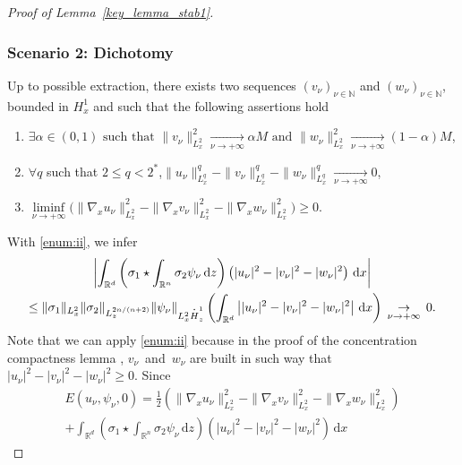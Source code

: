 \documentclass[11pt]{article}
\newenvironment{enumeratei}
{\bgroup\def\theenumi{\roman{enumi}}\def\theenumii{\arabic{enumii}}\begin{enumerate}}
{\end{enumerate}\egroup}
\DeclareRobustCommand{\accentset}[2]{\overset{#1}{#2}}
\theoremstyle{definition}
\newcommand*{\overbigdot}[1]{%
\accentset{\mbox{\large\bfseries .}}{#1}}
\newenvironment{ProofOf}[1]{\begin{proof}[Proof of #1]}{\end{proof}}
\newcommand{\R}{\mathbb{R}}
\let\ds\displaystyle
\newcommand{\ud}{\, {\mathrm{d}}}
\begin{document}
\begin{ProofOf}{Lemma~\ref{key_lemma_stab1}}
\subsubsection*{Scenario 2: Dichotomy} Up to possible extraction, there exists two sequences $(v_{\nu})_{\nu\in\mathbb N}$ and $(w_{\nu})_{\nu\in\mathbb N}$, bounded in $H_{x}^{1}$
and such that the following assertions hold
\begin{enumeratei}
\item\label{enum:i}
$\ds \exists\alpha\in(0,1)\text{ such that }\|v_{\nu}\|_{L_{x}^{2}}^{2}\underset{\nu\to+\infty}{\to}\alpha M\text{ and }\|w_{\nu}\|_{L_{x}^{2}}^{2}\underset{\nu\to+\infty}{\to}(1-\alpha)M$,
\item
\label{enum:ii}
$\forall q$ such that $2\leq q<2^{*}$,\quad$\ds\|u_{\nu}\|_{L_{x}^{q}}^{q}-\|v_{\nu}\|_{L_{x}^{q}}^{q}-\|w_{\nu}\|_{L_{x}^{q}}^{q}\underset{\nu\to+\infty}{\to}0$,
\item
\label{enum:iii}
$\ds\underset{\nu\to+\infty}{\liminf}\bigl(\|\nabla_{x}u_{\nu}\|_{L_{x}^{2}}^{2}-\|\nabla_{x}v_{\nu}\|_{L_{x}^{2}}^{2}-\|\nabla_{x}w_{\nu}\|_{L_{x}^{2}}^{2}\bigr)\geq0$.
\end{enumeratei}
\noindent
With \eqref{enum:ii}, we infer
\begin{multline}\label{application_ii}
\left|\int_{\R^{d}}\left(\sigma_{1}\star\int_{\R^{n}}\sigma_{2}\psi_{\nu}\ud z\right)\left(|u_{\nu}|^{2}-|v_{\nu}|^{2}-|w_{\nu}|^{2}\right)\ud x\right|\\
\leq\|\sigma_{1}\|_{L_{x}^{2}}\|\sigma_{2}\|_{L_{z}^{2n/(n+2)}}\|\psi_{\nu}\|_{L_{x}^{2}\overbigdot{H}_{z}^{1}}\left(\int_{\R^{d}}\left||u_{\nu}|^{2}-|v_{\nu}|^{2}-|w_{\nu}|^{2}\right|\ud x\right)\,\underset{\nu\to +\infty}{\to}\,0.
\end{multline}
Note that we can apply \eqref{enum:ii} because in the proof of the concentration compactness lemma
\cite[Prop.\,1.7.6, sp. (1.7.11) \& (1.7.12)]{Caze}
\cite[Proof of Lem.\,I.1 \& Lem.\,III.1]{PLLcc1},
$v_{\nu}$~and~$w_{\nu}$ are built in such way that $|u_{\nu}|^{2}-|v_{\nu}|^{2}-|w_{\nu}|^{2}\geq 0$. Since\vspace*{-10pt}
\bgroup
{}
\begin{multline*}
E(u_{\nu},\psi_{\nu},0)=\frac{1}{2}\left(\|\nabla_{x}u_{\nu}\|_{L_{x}^{2}}^{2}-\|\nabla_{x}v_{\nu}\|_{L_{x}^{2}}^{2}-\|\nabla_{x}w_{\nu}\|_{L_{x}^{2}}^{2}\right)\\
+\int_{\R^{d}}\left(\sigma_{1}\star\int_{\R^{n}}\sigma_{2}\psi_{\nu}\ud z\right)\left(|u_{\nu}|^{2}-|v_{\nu}|^{2}-|w_{\nu}|^{2}\right)\ud x

\end{multline*}
\end{ProofOf}
\end{document}

